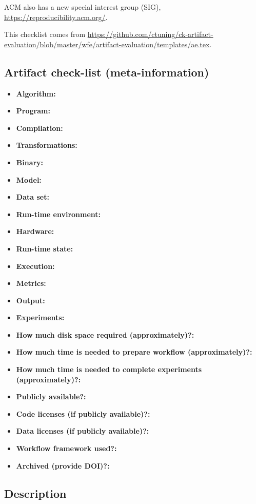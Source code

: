\documentclass[sigconf,10pt, screen]{acmart}
\begin{document}
ACM also has a new special interest group (SIG), \url{https://reproducibility.acm.org/}.

This checklist comes from \url{https://github.com/ctuning/ck-artifact-evaluation/blob/master/wfe/artifact-evaluation/templates/ae.tex}.
\subsection{Artifact check-list (meta-information)}

{\small
\begin{itemize}
  \item {\bf Algorithm: }
  \item {\bf Program: }
  \item {\bf Compilation: }
  \item {\bf Transformations: }
  \item {\bf Binary: }
  \item {\bf Model: }
  \item {\bf Data set: }
  \item {\bf Run-time environment: }
  \item {\bf Hardware: }
  \item {\bf Run-time state: }
  \item {\bf Execution: }
  \item {\bf Metrics: }
  \item {\bf Output: }
  \item {\bf Experiments: }
  \item {\bf How much disk space required (approximately)?: }
  \item {\bf How much time is needed to prepare workflow (approximately)?: }
  \item {\bf How much time is needed to complete experiments (approximately)?: }
  \item {\bf Publicly available?: }
  \item {\bf Code licenses (if publicly available)?: }
  \item {\bf Data licenses (if publicly available)?: }
  \item {\bf Workflow framework used?: }
  \item {\bf Archived (provide DOI)?: }
\end{itemize}
}

\subsection{Description}
\end{document}
